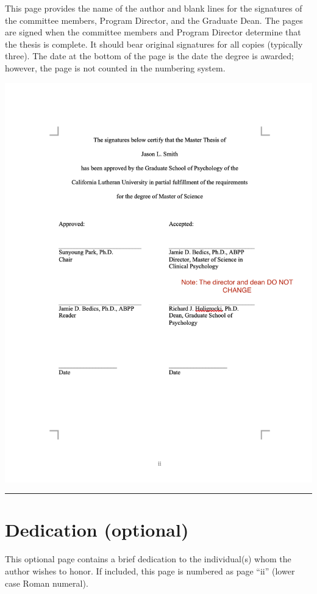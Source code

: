 \documentclass[
  openany]{book}
\begin{document}
This page provides the name of the author and blank lines for the signatures of the committee members, Program Director, and the Graduate Dean. The pages are signed when the committee members and Program Director determine that the thesis is complete. It should bear original signatures for all copies (typically three). The date at the bottom of the page is the date the degree is awarded; however, the page is not counted in the numbering system.

\includegraphics{images/signaturepage.png}

\begin{center}\rule{0.5\linewidth}{0.5pt}\end{center}

\hypertarget{dedication-optional}{%
\section{Dedication (optional)}\label{dedication-optional}}

This optional page contains a brief dedication to the individual(s) whom the author wishes to honor. If included, this page is numbered as page ``ii'' (lower case Roman numeral).
\end{document}

